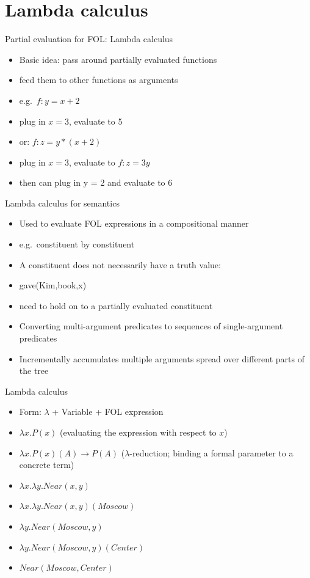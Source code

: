 \documentclass{beamer}
\begin{document}
\section{Lambda calculus}

\begin{frame}{Partial evaluation for FOL: Lambda calculus}
  \begin{itemize}
  \item Basic idea: pass around partially evaluated functions
  \item feed them to other functions as arguments
  \item e.g.\ $f: y = x + 2$
  \item plug in $x = 3$, evaluate to 5
  \item or: $f: z = y*(x+2)$
  \item plug in $x = 3$, evaluate to $f: z = 3y$
  \item then can plug in y = 2 and evaluate to 6
  \end{itemize}
\end{frame}

\begin{frame}{Lambda calculus for semantics}
  \begin{itemize}
  \item Used to evaluate FOL expressions in a compositional manner
  \item e.g.\ constituent by constituent
  \item A constituent does not necessarily have a truth value:
  \item gave(Kim,book,x)
  \item need to hold on to a partially evaluated constituent
  \item Converting multi-argument predicates to sequences of single-argument predicates
  \item Incrementally accumulates multiple arguments spread over different parts of the tree
  \end{itemize}
\end{frame}

\begin{frame}{Lambda calculus}
  \begin{itemize}
  \item Form: $\lambda$ + Variable + FOL expression
  \item $\lambda x.P(x)$ (evaluating the expression with respect to $x$)
  \item $\lambda x.P(x)(A) \rightarrow P(A)$ ($\lambda$-reduction; binding a formal parameter to a concrete term)
  \item $\lambda x.\lambda y.Near(x,y)$
  \item $\lambda x.\lambda y.Near(x,y)(Moscow)$
  \item $\lambda y.Near(Moscow,y)$
  \item $\lambda y.Near(Moscow,y)(Center)$
  \item $Near(Moscow,Center)$
  \end{itemize}
\end{frame}
\end{document}
